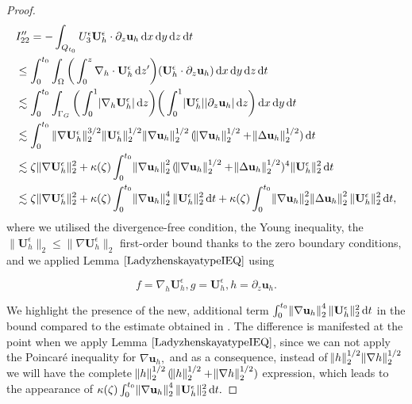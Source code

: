 \documentclass[11pt, a4paper]{article}
\newcommand*\diff{\mathop{}\!\mathrm{d}}
\begin{document}
\begin{proof}
\begin{equation} \nonumber
\begin{split}
& I_{22}'' = - \int_{Q_{t_0}} U^\epsilon_3 \mathbf{U}_h^\epsilon \cdot \partial_z \mathbf{u}_h \diff x \diff y \diff z \diff t \\
& \leq \int_0^{t_0} \int_\Omega \bigg ( \int_0^z \nabla_h \cdot \mathbf{U}_h^\epsilon \diff z' \bigg ) (\mathbf{U}_h^\epsilon \cdot \partial_z \mathbf{u}_h) \diff x \diff y \diff z \diff t \\
& \lesssim \int_0^{t_0} \int_{\Gamma_G} \bigg ( \int_0^1 \abs{\nabla_h \mathbf{U}_h^\epsilon} \diff z \bigg) \bigg ( \int_0^1 \abs{\mathbf{U}_h^\epsilon} \abs{\partial_z \mathbf{u}_h} \diff z \bigg ) \diff x \diff y \diff t \\
& \lesssim \int_0^{t_0} \| \nabla \mathbf{U}_h^\epsilon \| _2^{3/2} \| \mathbf{U}_h^\epsilon \| _2^{1/2} \norm{\nabla \mathbf{u}_h}_2^{1/2} (\norm{\nabla \mathbf{u}_h}_2^{1/2} + \norm{\Delta \mathbf{u}_h}_2^{1/2}) \diff t \\
& \lesssim \zeta \| \nabla \mathbf{U}_h^\epsilon \| ^2_2 + \kappa(\zeta) \int_0^{t_0} \norm{\nabla \mathbf{u}_h}_2^2 (\norm{\nabla \mathbf{u}_h}_2^{1/2} + \norm{\Delta \mathbf{u}_h}_2^{1/2})^4 \| \mathbf{U}_h^\epsilon \|_2^2 \diff t \\
& \lesssim \zeta \| \nabla \mathbf{U}_h^\epsilon \| ^2_2 + \kappa(\zeta) \int_0^{t_0} \norm{\nabla \mathbf{u}_h}_2^4 \| \mathbf{U}_h^\epsilon \|_2^2 \diff t + \kappa(\zeta) \int_0^{t_0} \norm{\nabla \mathbf{u}_h}_2^2 \norm{\Delta \mathbf{u}_h}_2^2 \| \mathbf{U}_h^\epsilon \| _2^2 \diff t,
\end{split}
\end{equation}
%
where we utilised the divergence-free condition, the Young inequality, the $\| \mathbf{U}_h^\epsilon \|_2 \leq \| \nabla \mathbf{U}_h^\epsilon \|_2$ first-order bound thanks to the zero boundary conditions, and we applied Lemma $\ref{LadyzhenskayatypeIEQ}$ using

$$f = \nabla_h \mathbf{U}_h^\epsilon, g = \mathbf{U}_h^\epsilon, h = \partial_z \mathbf{u}_h.$$

We highlight the presence of the new, additional term $\int_0^{t_0} \norm{\nabla \mathbf{u}_h}_2^4 \| \mathbf{U}_h^\epsilon \| _2^2 \diff t$ in the bound compared to the estimate obtained in \cite{li2019primitive}. The difference is manifested at the point when we apply Lemma $\ref{LadyzhenskayatypeIEQ}$, since we can not apply the Poincar\'e inequality for $\nabla \mathbf{u}_h,$ and as a consequence, instead of $\norm{h}_2^{1/2} \norm{\nabla h}_2^{1/2}$ we will have the complete $\norm{h}_2^{1/2} (\norm{h}_2^{1/2} + \norm{\nabla h}_2^{1/2})$ expression, which leads to the appearance of $\kappa(\zeta) \int_0^{t_0} \norm{\nabla \mathbf{u}_h}_2^4 \| \mathbf{U}_h^\epsilon \|_2^2 \diff t.$


\end{proof}
\end{document}
